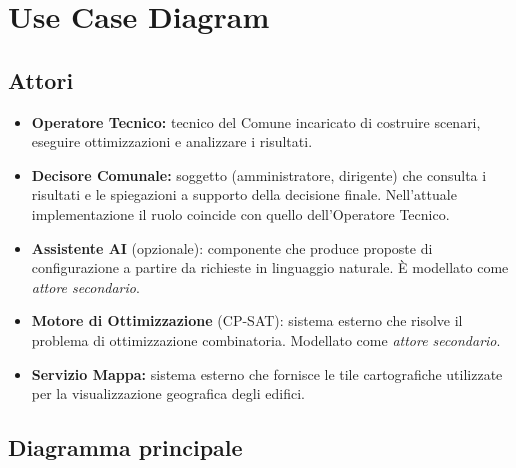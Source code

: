 \section{Use Case Diagram}

\subsection*{Attori}
\begin{itemize}
    \item \textbf{Operatore Tecnico:} tecnico del Comune incaricato di costruire scenari, eseguire ottimizzazioni e analizzare i risultati.
    \item \textbf{Decisore Comunale:} soggetto (amministratore, dirigente) che consulta i risultati e le spiegazioni a supporto della decisione finale. Nell'attuale implementazione il ruolo coincide con quello dell'Operatore Tecnico.
    \item \textbf{Assistente AI} (opzionale): componente che produce proposte di configurazione a partire da richieste in linguaggio naturale. È modellato come \emph{attore secondario}.
    \item \textbf{Motore di Ottimizzazione} (CP-SAT): sistema esterno che risolve il problema di ottimizzazione combinatoria. Modellato come \emph{attore secondario}.
    \item \textbf{Servizio Mappa:} sistema esterno che fornisce le tile cartografiche utilizzate per la visualizzazione geografica degli edifici.
\end{itemize}

\subsection*{Diagramma principale}

